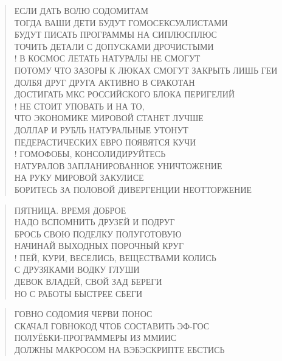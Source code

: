 \poemtitle{***}
\begin{verse}
ЕСЛИ ДАТЬ ВОЛЮ СОДОМИТАМ\\
ТОГДА ВАШИ ДЕТИ БУДУТ ГОМОСЕКСУАЛИСТАМИ\\
БУДУТ ПИСАТЬ ПРОГРАММЫ НА СИПЛЮСПЛЮС\\
ТОЧИТЬ ДЕТАЛИ С ДОПУСКАМИ ДРОЧИСТЫМИ\\!
В КОСМОС ЛЕТАТЬ НАТУРАЛЫ НЕ СМОГУТ\\
ПОТОМУ ЧТО ЗАЗОРЫ К ЛЮКАХ СМОГУТ ЗАКРЫТЬ ЛИШЬ ГЕИ\\
ДОЛБЯ ДРУГ ДРУГА АКТИВНО В СРАКОТАН\\
ДОСТИГАТЬ МКС РОССИЙСКОГО БЛОКА ПЕРИГЕЛИЙ\\!
НЕ СТОИТ УПОВАТЬ И НА ТО, \\
ЧТО ЭКОНОМИКЕ МИРОВОЙ СТАНЕТ ЛУЧШЕ\\
ДОЛЛАР И РУБЛЬ НАТУРАЛЬНЫЕ УТОНУТ\\
ПЕДЕРАСТИЧЕСКИХ ЕВРО ПОЯВЯТСЯ КУЧИ\\!
ГОМОФОБЫ, КОНСОЛИДИРУЙТЕСЬ\\
НАТУРАЛОВ ЗАПЛАНИРОВАННОЕ УНИЧТОЖЕНИЕ\\
НА РУКУ МИРОВОЙ ЗАКУЛИСЕ\\
БОРИТЕСЬ ЗА ПОЛОВОЙ ДИВЕРГЕНЦИИ НЕОТТОРЖЕНИЕ
\end{verse}

\poemtitle{***}
\begin{verse}
ПЯТНИЦА. ВРЕМЯ ДОБРОЕ\\
НАДО ВСПОМНИТЬ ДРУЗЕЙ И ПОДРУГ\\
БРОСЬ СВОЮ ПОДЕЛКУ ПОЛУГОТОВУЮ\\
НАЧИНАЙ ВЫХОДНЫХ ПОРОЧНЫЙ КРУГ\\!
ПЕЙ, КУРИ, ВЕСЕЛИСЬ, ВЕЩЕСТВАМИ КОЛИСЬ\\
С ДРУЗЯКАМИ ВОДКУ ГЛУШИ\\
ДЕВОК ВЛАДЕЙ, СВОЙ ЗАД БЕРЕГИ\\
НО С РАБОТЫ БЫСТРЕЕ СБЕГИ
\end{verse}

\poemtitle{***}
\begin{verse}
ГОВНО СОДОМИЯ ЧЕРВИ ПОНОС\\
СКАЧАЛ ГОВНОКОД ЧТОБ СОСТАВИТЬ ЭФ-ГОС\\
ПОЛУЁБКИ-ПРОГРАММЕРЫ ИЗ ММИИС\\
ДОЛЖНЫ МАКРОСОМ НА ВЭБЭСКРИПТЕ ЕБСТИСЬ
\end{verse}

